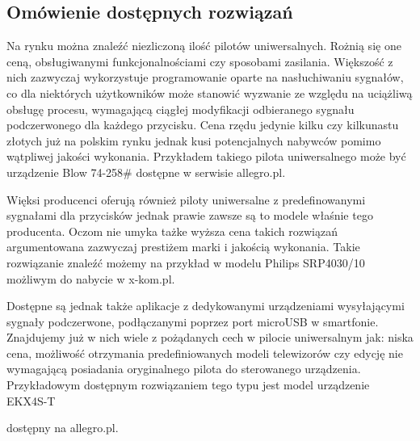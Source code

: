 \documentclass[12pt,twoside]{article}
\begin{document}
\subsection{Omówienie dostępnych rozwiązań}
{Na rynku można znaleźć niezliczoną ilość pilotów uniwersalnych. Rożnią się one 
ceną, obsługiwanymi funkcjonalnościami czy sposobami zasilania. Większość z nich zazwyczaj 
wykorzystuje programowanie oparte na nasłuchiwaniu sygnałów, co dla niektórych użytkowników może stanowić 
wyzwanie ze względu na uciążliwą obsługę procesu, wymagającą ciągłej modyfikacji odbieranego 
sygnału podczerwonego dla każdego przycisku. Cena rzędu jedynie kilku czy kilkunastu złotych 
już na polskim rynku jednak kusi potencjalnych nabywców pomimo wątpliwej jakości wykonania. Przykładem 
takiego pilota uniwersalnego może być urządzenie Blow 74-258\#\cite{cheapController} dostępne w serwisie allegro.pl. 

Więksi producenci oferują również piloty uniwersalne z predefinowanymi sygnałami dla przycisków jednak
prawie zawsze są to modele właśnie tego producenta. Oczom nie umyka tażke wyższa cena takich
rozwiązań argumentowana zazwyczaj prestiżem marki i jakością wykonania. Takie rozwiązanie znaleźć
możemy na przykład w modelu Philips SRP4030/10\cite{expensiveController} możliwym do nabycie w x-kom.pl.

Dostępne są jednak także aplikacje z dedykowanymi urządzeniami wysyłającymi sygnały podczerwone, 
podłączanymi poprzez port microUSB w smartfonie. Znajdujemy już w nich wiele z pożądanych cech w pilocie
 uniwersalnym jak: niska cena, możliwość otrzymania predefiniowanych modeli telewizorów 
 czy edycję nie wymagającą posiadania oryginalnego pilota do sterowanego urządzenia. Przykładowym dostępnym
rozwiązaniem tego typu jest model urządzenie EKX4S-T\cite{appController}} dostępny na allegro.pl.
\end{document}
